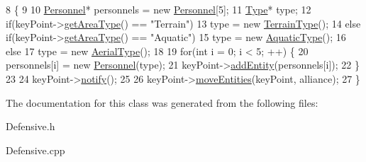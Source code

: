 \begin{DoxyCode}
8                                                                    \{
9     
10     \hyperlink{classPersonnel}{Personnel}* personnels = \textcolor{keyword}{new} \hyperlink{classPersonnel}{Personnel}[5];
11     \hyperlink{classType}{Type}* type;
12     \textcolor{keywordflow}{if}(keyPoint->\hyperlink{classKeyPoint_a2e7f0accc7c9be244da25bb1189c5a1d}{getAreaType}() == \textcolor{stringliteral}{"Terrain"})
13         type = \textcolor{keyword}{new} \hyperlink{classTerrainType}{TerrainType}();
14     \textcolor{keywordflow}{else} \textcolor{keywordflow}{if}(keyPoint->\hyperlink{classKeyPoint_a2e7f0accc7c9be244da25bb1189c5a1d}{getAreaType}() == \textcolor{stringliteral}{"Aquatic"})
15         type = \textcolor{keyword}{new} \hyperlink{classAquaticType}{AquaticType}();
16     \textcolor{keywordflow}{else}
17         type = \textcolor{keyword}{new} \hyperlink{classAerialType}{AerialType}();
18 
19     \textcolor{keywordflow}{for}(\textcolor{keywordtype}{int} i = 0; i < 5; ++) \{
20         personnels[i] = \textcolor{keyword}{new} \hyperlink{classPersonnel}{Personnel}(type);
21         keyPoint->\hyperlink{classKeyPoint_aad6d7102c8e3d11fe5f29b163f50dbc3}{addEntity}(personnels[i]);
22     \}
23 
24     keyPoint->\hyperlink{classKeyPoint_a5b21817babe753b2b684d70479f3eaf2}{notify}();
25     
26     keyPoint->\hyperlink{classKeyPoint_a3fc425554378989ba83ebd22f7305f14}{moveEntities}(keyPoint, alliance);
27 \}
\end{DoxyCode}


The documentation for this class was generated from the following files\+:\begin{DoxyCompactItemize}
\item 
Defensive.\+h\item 
Defensive.\+cpp\end{DoxyCompactItemize}
